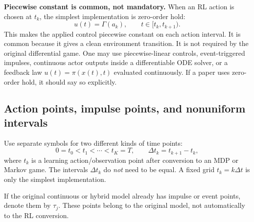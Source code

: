 \documentclass[11pt,a4paper]{article}
\begin{document}
\begin{boxednote}
\textbf{Piecewise constant is common, not mandatory.}
When an RL action is chosen at $t_k$, the simplest implementation is zero-order hold:
\[
u(t)=\Gamma(a_k),\qquad t\in[t_k,t_{k+1}).
\]
This makes the applied control piecewise constant on each action interval. It is common because it gives a clean environment transition. It is not required by the original differential game. One may use piecewise-linear controls, event-triggered impulses, continuous actor outputs inside a differentiable ODE solver, or a feedback law $u(t)=\pi(x(t),t)$ evaluated continuously. If a paper uses zero-order hold, it should say so explicitly.
\end{boxednote}

\subsection{Action points, impulse points, and nonuniform intervals}
Use separate symbols for two different kinds of time points:
\[
0=t_0<t_1<\cdots<t_K=T,\qquad \Delta t_k=t_{k+1}-t_k,
\]
where $t_k$ is a learning action/observation point after conversion to an MDP or Markov game. The intervals $\Delta t_k$ do \emph{not} need to be equal. A fixed grid $t_k=k\Delta t$ is only the simplest implementation.

If the original continuous or hybrid model already has impulse or event points, denote them by $\tau_j$. These points belong to the original model, not automatically to the RL conversion.

\begin{center}
\end{center}
\end{document}
